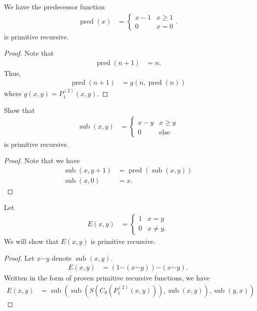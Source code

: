 \documentclass[10pt]{mypackage}
\DeclareMathOperator{\pred}{pred}
\DeclareMathOperator{\sub}{sub}
\begin{document}
\begin{example}
We have the predecessor function
\begin{align*}
  \pred(x) &= \begin{cases}
    x-1 & x \geq 1\\
    0 & x = 0
  \end{cases}.
\end{align*}
is primitive recursive.
\begin{proof}
  Note that
  \begin{align*}
    \pred\left(n+1\right) &= n.
  \end{align*}
  Thus,
  \begin{align*}
    \pred\left(n+1\right) &= g\left(n,\pred(n)\right)
  \end{align*}
  where $g\left(x,y\right) = P_{1}^{(2)}(x,y)$.
\end{proof}
\end{example}
\begin{example}
  Show that 
  \begin{align*}
    \sub\left(x,y\right) &= \begin{cases}
      x-y & x \geq y\\
      0 & \text{else}
    \end{cases}
  \end{align*}
  is primitive recursive.
  \begin{proof}
    Note that we have
    \begin{align*}
      \sub\left(x,y+1\right) &= \pred\left(\sub\left(x,y\right)\right)\\
      \sub\left(x,0\right) &= x.
    \end{align*}
  \end{proof}
\end{example}
\begin{example}
Let
\begin{align*}
  E\left(x,y\right) &= \begin{cases}
    1 & x=y\\
    0 & x\neq y.
  \end{cases}
\end{align*}
We will show that $E\left(x,y\right)$ is primitive recursive.
\begin{proof}
  Let $x\dot{-} y$ denote $\sub\left(x,y\right)$.
  \begin{align*}
    E\left(x,y\right) &= \left(1\dot{-}\left(x\dot{-}y\right)\right)\dot{-}\left(x\dot{-}y\right).
  \end{align*}
  Written in the form of proven primitive recursive functions, we have
  \begin{align*}
    E\left(x,y\right) &= \sub\left(\sub\left(S\left(C_{0}\left(P_{1}^{(2)}\left(x,y\right)\right)\right),\sub\left(x,y\right)\right),\sub\left(y,x\right)\right)
  \end{align*}
\end{proof}

\end{example}
\end{document}
